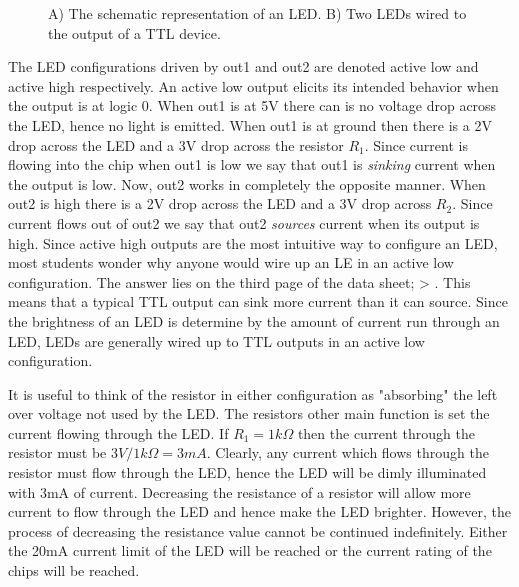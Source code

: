\begin{figure}[ht]
\caption{A) The schematic representation of an LED.  B) Two LEDs wired
to the output of a TTL device.}
\label{fig:led}
\end{figure}

The LED configurations driven by out1 and out2 are denoted active 
low and active high respectively.  An active low 
output elicits its intended behavior when the output is at logic 0.
When out1 is at 5V there can is no voltage drop across the LED, 
hence no light is emitted.  When out1 is at ground then there is 
a 2V drop across the LED and a 3V drop across the resistor $R_1$.  
Since current is 
flowing into the chip when out1 is low we say that out1 is 
{\it sinking} current when the output is low.  Now, out2 works in
completely the opposite manner.  When out2 is high there is a 
2V drop across the LED and a 3V drop across $R_2$.  Since current 
flows out of out2 we say that out2 {\it sources} current when its 
output is high.  Since active high outputs are the most intuitive
way to configure an LED, most students wonder why anyone would 
wire up an LE in an active low configuration.  The answer lies on
the third page of the data sheet; \IOL > \IOH.  This means
that a typical TTL output can sink more current than it can source.
Since the brightness of an LED is determine by the amount of current
run through an LED, LEDs are generally wired up to TTL outputs
in an active low configuration.

It is useful to think of the resistor in either configuration as 
"absorbing" the left over voltage not used by the LED.  The resistors 
other main function is set the current 
flowing through the LED.  If $R_1 = 1k \Omega$ then the current 
through the resistor must be $3V/1k \Omega = 3mA$.  Clearly, any
current which flows through the resistor must flow through the
LED, hence the LED will be dimly illuminated with 3mA of current.  
Decreasing the resistance of a  
resistor will allow more current to flow through the LED and hence
make the LED brighter.  However, the process of decreasing the
resistance value cannot be continued indefinitely.  Either the 20mA
current limit of the LED will be reached or the current rating of
the chips will be reached.  


